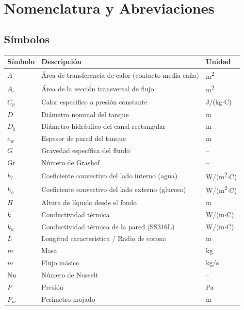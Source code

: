 \section*{Nomenclatura y Abreviaciones}

\subsection*{S\'imbolos}
\begin{tabularx}{\textwidth}{@{}lXl@{}}
	\toprule
	\textbf{S\'imbolo} & \textbf{Descripci\'on} & \textbf{Unidad} \\
	\midrule
	$A$ & \'Area de transferencia de calor (contacto media ca\~na) & m\textsuperscript{2} \\
	$A_c$ & \'Area de la secci\'on transversal de flujo & m\textsuperscript{2} \\
	$C_p$ & Calor espec\'ifico a presi\'on constante & J/(kg$\cdot$\textdegree C) \\
	$D$ & Di\'ametro nominal del tanque & m \\
	$D_h$ & Di\'ametro hidr\'aulico del canal rectangular & m \\
	$e_w$ & Espesor de pared del tanque & m \\
	$G$ & Gravedad espec\'ifica del fluido & -- \\
	$\text{Gr}$ & N\'umero de Grashof & -- \\
	$h_i$ & Coeficiente convectivo del lado interno (agua) & W/(m\textsuperscript{2}$\cdot$\textdegree C) \\
	$h_o$ & Coeficiente convectivo del lado externo (glucosa) & W/(m\textsuperscript{2}$\cdot$\textdegree C) \\
	$H$ & Altura de l\'iquido desde el fondo & m \\
	$k$ & Conductividad t\'ermica & W/(m$\cdot$\textdegree C) \\
	$k_w$ & Conductividad t\'ermica de la pared (SS316L) & W/(m$\cdot$\textdegree C) \\
	$L$ & Longitud caracter\'istica / Radio de corona & m \\
	$m$ & Masa & kg \\
	$\dot{m}$ & Flujo m\'asico & kg/s \\
	$\text{Nu}$ & N\'umero de Nusselt & -- \\
	$P$ & Presi\'on & Pa \\
	$P_m$ & Per\'imetro mojado & m \\

\end{tabularx}
